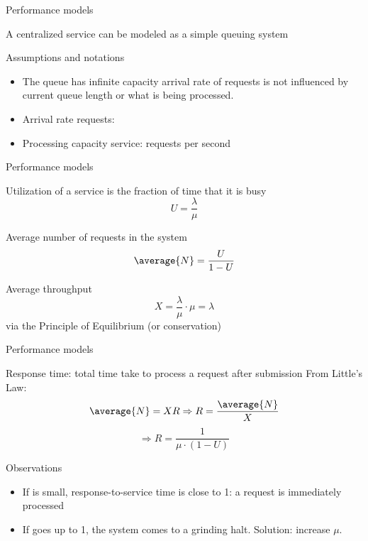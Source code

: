   \begin{slide}{Performance models}
    \begin{block}{A centralized service can be modeled as a simple queuing system}
      \centering{}
    \end{block}
    \begin{block}{Assumptions and notations}
      \begin{itemize}\tightlist
      \item The queue has infinite capacity \mathexpr{\Rightarrow} arrival rate of requests is not influenced
        by current queue length or what is being processed.
      \item Arrival rate requests: \mathexpr{\lambda}
      \item Processing capacity service: \mathexpr{\mu} requests per second
      \end{itemize}
    \end{block}
  \end{slide}
  \begin{slide}{Performance models}
    \begin{block}{Utilization  of a service is the fraction of time that it is busy}
      \[ U = \frac{\lambda}{\mu} \]
    \end{block}
    \begin{block}{Average number of requests in the system}
      \[ \average{N} = \frac{U}{1-U} \]
    \end{block}
    \begin{block}{Average throughput}
      \[ X = \frac{\lambda}{\mu} \cdot \mu = \lambda \]
      via the Principle of Equilibrium (or conservation)
    \end{block}
  \end{slide}
  \begin{slide}{Performance models}
    \begin{block}{Response time: total time take to process a request after submission}
      From Little's Law:
      \[ \average{N} = XR \Rightarrow R = \frac{\average{N}}{X}\]
      \[ \Rightarrow R = \frac{1}{\mu\cdot(1-U)} \]
    \end{block}
    \begin{block}{Observations}
      \begin{itemize}
      \item If  is small, response-to-service time is close to 1: a request is immediately
        processed
      \item If  goes up to 1, the system comes to a grinding halt. \newline Solution: increase $\mu$.
      \end{itemize}
    \end{block}
  \end{slide}
